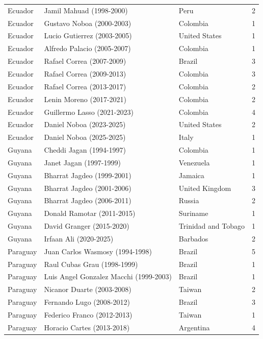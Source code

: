 \documentclass[11pt,a4paper]{article}
\begin{document}
\begin{longtable}{lllr}
  Ecuador & Jamil Mahuad (1998-2000) & Peru &   2 \\ 
  Ecuador & Gustavo Noboa (2000-2003) & Colombia &   1 \\ 
  Ecuador & Lucio Gutierrez (2003-2005) & United States &   1 \\ 
  Ecuador & Alfredo Palacio (2005-2007) & Colombia &   1 \\ 
  Ecuador & Rafael Correa (2007-2009) & Brazil &   3 \\ 
  Ecuador & Rafael Correa (2009-2013) & Colombia &   3 \\ 
  Ecuador & Rafael Correa (2013-2017) & Colombia &   2 \\ 
  Ecuador & Lenin Moreno (2017-2021) & Colombia &   2 \\ 
  Ecuador & Guillermo Lasso (2021-2023) & Colombia &   4 \\ 
  Ecuador & Daniel Noboa (2023-2025) & United States &   2 \\ 
  Ecuador & Daniel Noboa (2025-2025) & Italy &   1 \\ 
  Guyana & Cheddi Jagan (1994-1997) & Colombia &   1 \\ 
  Guyana & Janet Jagan (1997-1999) & Venezuela &   1 \\ 
  Guyana & Bharrat Jagdeo (1999-2001) & Jamaica &   1 \\ 
  Guyana & Bharrat Jagdeo (2001-2006) & United Kingdom &   3 \\ 
  Guyana & Bharrat Jagdeo (2006-2011) & Russia &   2 \\ 
  Guyana & Donald Ramotar (2011-2015) & Suriname &   1 \\ 
  Guyana & David Granger (2015-2020) & Trinidad and Tobago &   1 \\ 
  Guyana & Irfaan Ali (2020-2025) & Barbados &   2 \\ 
  Paraguay & Juan Carlos Wasmosy (1994-1998) & Brazil &   5 \\ 
  Paraguay & Raul Cubas Grau (1998-1999) & Brazil &   1 \\ 
  Paraguay & Luis Angel Gonzalez Macchi (1999-2003) & Brazil &   1 \\ 
  Paraguay & Nicanor Duarte (2003-2008) & Taiwan &   2 \\ 
  Paraguay & Fernando Lugo (2008-2012) & Brazil &   3 \\ 
  Paraguay & Federico Franco (2012-2013) & Taiwan &   1 \\ 
  Paraguay & Horacio Cartes (2013-2018) & Argentina &   4 \\ 

\end{longtable}
\end{document}

